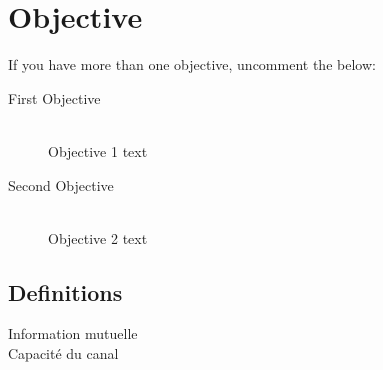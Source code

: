 \documentclass{report}
\begin{document}
\section{Objective}

 If you have more than one objective, uncomment the below:
\begin{description}
\item[First Objective] \hfill \\
Objective 1 text
\item[Second Objective] \hfill \\
Objective 2 text
\end{description}

\subsection{Definitions}
\label{definitions}
\begin{description}
\item[Information mutuelle]

\item[Capacité du canal]

\end{description} 
 
















\end{document}
